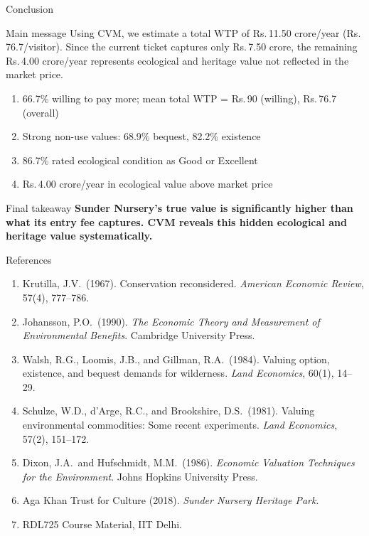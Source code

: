 \documentclass[10pt, aspectratio=169]{beamer}
\newcommand{\rupee}{\textrm{Rs.}\,}
\begin{document}
\begin{frame}{Conclusion}
    \begin{block}{Main message}
        \small
        Using CVM, we estimate a total WTP of \rupee 11.50 crore/year (\rupee 76.7/visitor). Since the current ticket captures only \rupee 7.50 crore, the remaining \rupee 4.00 crore/year represents ecological and heritage value not reflected in the market price.
    \end{block}

    \vspace{0.4em}
    \begin{enumerate}
        \item 66.7\% willing to pay more; mean total WTP = \rupee 90 (willing), \rupee 76.7 (overall)
        \item Strong non-use values: 68.9\% bequest, 82.2\% existence
        \item 86.7\% rated ecological condition as Good or Excellent
        \item \rupee 4.00 crore/year in ecological value above market price
    \end{enumerate}

    \vspace{0.5em}
    \begin{exampleblock}{Final takeaway}
        \centering
        \textbf{Sunder Nursery's true value is significantly higher than what its entry fee captures. CVM reveals this hidden ecological and heritage value systematically.}
    \end{exampleblock}
\end{frame}

\begin{frame}{References}
    \small
    \begin{enumerate}
        \item[{[1]}] Krutilla, J.V.\ (1967). Conservation reconsidered. \textit{American Economic Review}, 57(4), 777--786.
        \item[{[2]}] Johansson, P.O.\ (1990). \textit{The Economic Theory and Measurement of Environmental Benefits}. Cambridge University Press.
        \item[{[3]}] Walsh, R.G., Loomis, J.B., and Gillman, R.A.\ (1984). Valuing option, existence, and bequest demands for wilderness. \textit{Land Economics}, 60(1), 14--29.
        \item[{[4]}] Schulze, W.D., d'Arge, R.C., and Brookshire, D.S.\ (1981). Valuing environmental commodities: Some recent experiments. \textit{Land Economics}, 57(2), 151--172.
        \item[{[5]}] Dixon, J.A.\ and Hufschmidt, M.M.\ (1986). \textit{Economic Valuation Techniques for the Environment}. Johns Hopkins University Press.
        \item[{[6]}] Aga Khan Trust for Culture (2018). \textit{Sunder Nursery Heritage Park}.
        \item[{[7]}] RDL725 Course Material, IIT Delhi.
    \end{enumerate}
\end{frame}
\end{document}
